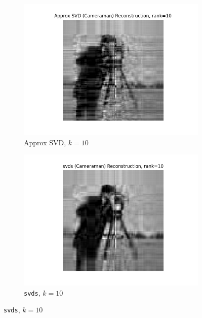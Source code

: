 \documentclass[11pt,a4paper, margin=1in]{article}
\begin{document}
\begin{enumerate}
    \begin{figure}[H]
      \centering
      \begin{subfigure}[b]{0.35\textwidth}
        \centering
        \includegraphics[width=\textwidth]{Approx SVD (Cameraman)_reconstruction_rank_10.png}
        \caption{Approx SVD, $k=10$}
      \end{subfigure}
      \hfill
      \begin{subfigure}[b]{0.35\textwidth}
          \centering
          \includegraphics[width=\textwidth]{svds (Cameraman)_reconstruction_rank_10.png}
          \caption{\texttt{svds}, $k=10$}
      \end{subfigure}
      

\end{figure}
\end{enumerate}
\end{document}
